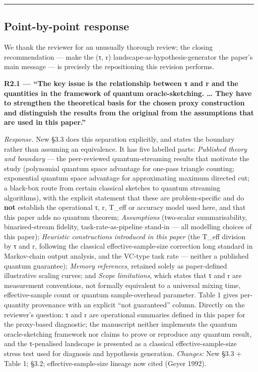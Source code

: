 \documentclass[
  11pt,
]{article}
\begin{document}
\begin{center}\rule{0.5\linewidth}{0.5pt}\end{center}

\subsection{Point-by-point response}\label{point-by-point-response}

We thank the reviewer for an unusually thorough review; the closing
recommendation --- make the (τ, r) landscape-as-hypothesis-generator the
paper's main message --- is precisely the repositioning this revision
performs.

\textbf{R2.1 --- ``The key issue is the relationship between τ and r and
the quantities in the framework of quantum oracle-sketching. \ldots{}
They have to strengthen the theoretical basis for the chosen proxy
construction and distinguish the results from the original from the
assumptions that are used in this paper.''}

\emph{Response.} New §3.3 does this separation explicitly, and states
the boundary rather than assuming an equivalence. It has five labelled
parts: \emph{Published theory and boundary} --- the peer-reviewed
quantum-streaming results that motivate the study (polynomial quantum
space advantage for one-pass triangle counting; exponential quantum
space advantage for approximating maximum directed cut; a black-box
route from certain classical sketches to quantum streaming algorithms),
with the explicit statement that these are problem-specific and do
\textbf{not} establish the operational τ, r, T\_eff or accuracy model
used here, and that this paper adds no quantum theorem;
\emph{Assumptions} (two-scalar summarisability, binarised-stream
fidelity, task-rate-as-pipeline stand-in --- all modelling choices of
this paper); \emph{Heuristic constructions introduced in this paper}
(the T\_eff division by τ and r, following the classical
effective-sample-size correction long standard in Markov-chain output
analysis, and the VC-type task rate --- neither a published quantum
guarantee); \emph{Memory references}, retained solely as paper-defined
illustrative scaling curves; and \emph{Scope limitations}, which states
that τ and r are measurement conventions, not formally equivalent to a
universal mixing time, effective-sample count or quantum sample-overhead
parameter. Table 1 gives per-quantity provenance with an explicit ``not
guaranteed'' column. Directly on the reviewer's question: τ and r are
operational summaries defined in this paper for the proxy-based
diagnostic; the manuscript neither implements the quantum
oracle-sketching framework nor claims to prove or reproduce any quantum
result, and the τ-penalised landscape is presented as a classical
effective-sample-size stress test used for diagnosis and hypothesis
generation. \emph{Changes:} New §3.3 + Table 1; §3.2;
effective-sample-size lineage now cited (Geyer 1992).
\end{document}
